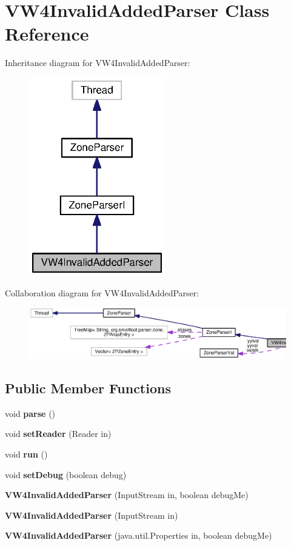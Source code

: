 \section{V\+W4\+Invalid\+Added\+Parser Class Reference}
\label{classorg_1_1smallfoot_1_1parser_1_1zone_1_1VW4InvalidAddedParser}


Inheritance diagram for V\+W4\+Invalid\+Added\+Parser\+:\nopagebreak
\begin{figure}[H]
\begin{center}
\leavevmode
\includegraphics[width=168pt]{classorg_1_1smallfoot_1_1parser_1_1zone_1_1VW4InvalidAddedParser__inherit__graph}
\end{center}
\end{figure}


Collaboration diagram for V\+W4\+Invalid\+Added\+Parser\+:\nopagebreak
\begin{figure}[H]
\begin{center}
\leavevmode
\includegraphics[width=350pt]{classorg_1_1smallfoot_1_1parser_1_1zone_1_1VW4InvalidAddedParser__coll__graph}
\end{center}
\end{figure}
\subsection*{Public Member Functions}
\begin{DoxyCompactItemize}
\item 
void {\bf parse} ()
\item 
void {\bf set\+Reader} (Reader in)
\item 
void {\bf run} ()
\item 
void {\bf set\+Debug} (boolean debug)
\item 
{\bf V\+W4\+Invalid\+Added\+Parser} (Input\+Stream in, boolean debug\+Me)
\item 
{\bf V\+W4\+Invalid\+Added\+Parser} (Input\+Stream in)
\item 
{\bf V\+W4\+Invalid\+Added\+Parser} (java.\+util.\+Properties in, boolean debug\+Me)
\end{DoxyCompactItemize}
